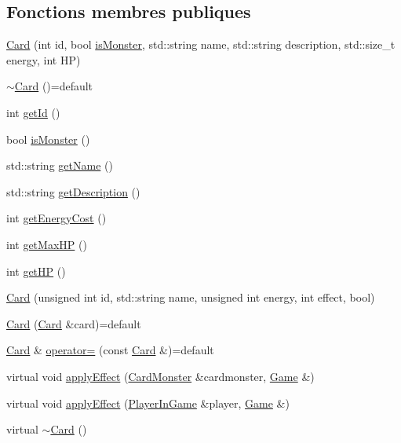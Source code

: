 \subsection*{Fonctions membres publiques}
\begin{DoxyCompactItemize}
\item 
\hyperlink{classCard_a7697964e07b49437270461cdd1b21f54}{Card} (int id, bool \hyperlink{classCard_a41da498b0822b35dcbb69293851b39fc}{is\+Monster}, std\+::string name, std\+::string description, std\+::size\+\_\+t energy, int H\+P)
\item 
\hyperlink{classCard_a2914c3978ed065d99ec335bc6788e060}{$\sim$\+Card} ()=default
\item 
int \hyperlink{classCard_a017122109ae10b3c0cce6b267f323414}{get\+Id} ()
\item 
bool \hyperlink{classCard_a41da498b0822b35dcbb69293851b39fc}{is\+Monster} ()
\item 
std\+::string \hyperlink{classCard_ad060fe107bfaf4741c671615885b314a}{get\+Name} ()
\item 
std\+::string \hyperlink{classCard_a9ffcf78c4078240a1c454f972420e5ba}{get\+Description} ()
\item 
int \hyperlink{classCard_a8e4e806367f17a15673abf8b9aea9503}{get\+Energy\+Cost} ()
\item 
int \hyperlink{classCard_a6923e2fb5d6c193195f3a5ccef7d73d8}{get\+Max\+H\+P} ()
\item 
int \hyperlink{classCard_abf23a8fc4f0b6b75bc077385735502cc}{get\+H\+P} ()
\item 
\hyperlink{classCard_a93a01fd515bd91db24f7e0a3eb93d7d9}{Card} (unsigned int id, std\+::string name, unsigned int energy, int effect, bool)
\item 
\hyperlink{classCard_ae3384913af007a1c1a536228778da6b0}{Card} (\hyperlink{classCard}{Card} \&card)=default
\item 
\hyperlink{classCard}{Card} \& \hyperlink{classCard_a61af6ac06f1d73616a7e9b4a1b19c90d}{operator=} (const \hyperlink{classCard}{Card} \&)=default
\item 
virtual void \hyperlink{classCard_a68c2becce15d5c89cec9972a8674e602}{apply\+Effect} (\hyperlink{classCardMonster}{Card\+Monster} \&cardmonster, \hyperlink{classGame}{Game} \&)
\item 
virtual void \hyperlink{classCard_a0ee99642963ac428501623982a21aa1b}{apply\+Effect} (\hyperlink{classPlayerInGame}{Player\+In\+Game} \&player, \hyperlink{classGame}{Game} \&)
\item 
virtual \hyperlink{classCard_a2b09fd7321b238b45b2ad2f034760e5d}{$\sim$\+Card} ()

\end{DoxyCompactItemize}
